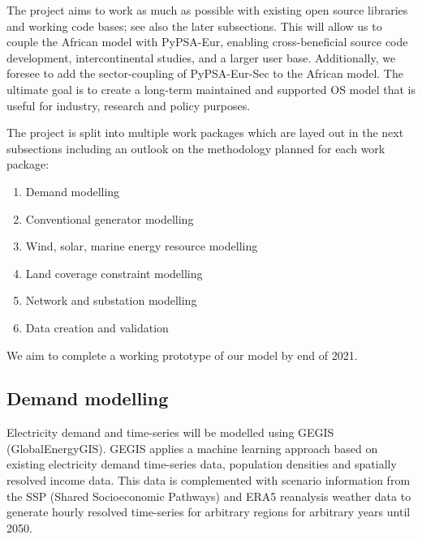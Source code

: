 \documentclass[conference, a4paper]{IEEEtran}
\begin{document}
The project aims to work as much as possible with existing open source libraries and working code bases; see also the later subsections.
This will allow us to couple the African model with PyPSA-Eur, enabling cross-beneficial source code development, intercontinental studies, and a larger user base.
Additionally, we foresee to add the sector-coupling of PyPSA-Eur-Sec to the African model.
The ultimate goal is to create a long-term maintained and supported OS model that is useful for industry, research and policy purposes.




The project is split into multiple work packages which are layed out in the next subsections including an outlook on the methodology planned for each work package:

\begin{enumerate}
    \item Demand modelling
    \item Conventional generator modelling
    \item Wind, solar, marine energy resource modelling
    \item Land coverage constraint modelling
    \item Network and substation modelling
    \item Data creation and validation 
\end{enumerate}

We aim to complete a working prototype of our model by end of 2021.

\subsection{Demand modelling} %
Electricity demand and time-series will be modelled using GEGIS (GlobalEnergyGIS).
GEGIS applies a machine learning approach based on existing electricity demand time-series data, population densities and spatially resolved income data.
This data is complemented with scenario information from the SSP (Shared Socioeconomic Pathways) and ERA5 reanalysis weather data to generate hourly resolved time-series for arbitrary regions for arbitrary years until 2050.
\end{document}
